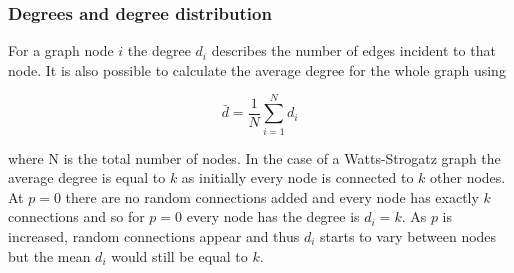 \subsubsection{Degrees and degree distribution}


For a graph node $i$ the degree $d_i$ describes the number of edges incident to that node. It is also possible to calculate the average degree for the whole graph using 

\begin{equation}
    \bar{d} = \frac{1}{N} \sum^N_{i = 1} d_i 
\end{equation}

where N is the total number of nodes. In the case of a Watts-Strogatz graph the average degree is equal to $k$ as initially every node is connected to $k$ other nodes. At $p=0$ there are no random connections added and every node has exactly $k$ connections and so for $p=0$ every node has the degree is $d_i = k$. As $p$ is increased, random connections appear and thus $d_i$ starts to vary between nodes but the mean $d_i$ would still be equal to $k$.